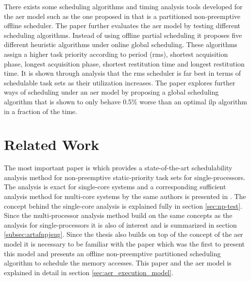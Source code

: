 \documentclass{kththesis}
\begin{document}
There exists some scheduling algorithms and timing analysis tools developed for the \acrshort{aer}
model such as the one proposed in \parencite{durrieu_predictable_2014} that is a partitioned
non-preemptive offline scheduler. The paper \parencite{maia_closer_2016} further evaluates the
\acrshort{aer} model by testing different scheduling algorithms. Instead of using offline partial
scheduling it proposes five different heuristic algorithms under online global scheduling. These
algorithms assign a higher task priority according to period (\acrshort{rms}), shortest acquisition
phase, longest acquisition phase, shortest restitution time and longest restitution time. It is
shown through analysis that the \acrshort{rms} scheduler is far best in terms of schedulable task
sets as their utilization increases. The paper \parencite{becker_contention-free_2016} explores
further ways of scheduling under an \acrshort{aer} model by proposing a global scheduling algorithm
that is shown to only behave 0.5\% worse than an optimal \acrshort{ilp} algorithm in a fraction of
the time.



\section{Related Work} \label{sec:related_work}

The most important paper is \parencite{nasri_exact_2017} which provides a state-of-the-art
schedulability analysis method for non-preemptive static-priority task sets for single-processors.
The analysis is exact for single-core systems and a corresponding sufficient analysis method for
multi-core systems by the same authors is presented in \parencite{nasry_response-time_2018}. The
concept behind the single-core analysis is explained fully in section \ref{sec:np-test}. Since the
multi-processor analysis method build on the same concepts as the analysis for single-processors it
is also of interest and is summarized in section \ref{subsec:artafnpjsug}. Since the thesis also
builds on top of the concept of the \acrshort{aer} model it is necessary to be familiar with the
paper \parencite{durrieu_predictable_2014} which was the first to present this model and presents an
offline non-preemptive partitioned scheduling algorithm to schedule the memory accesses. This paper
and the \acrshort{aer} model is explained in detail in section \ref{sec:aer_execution_model}.
\end{document}
